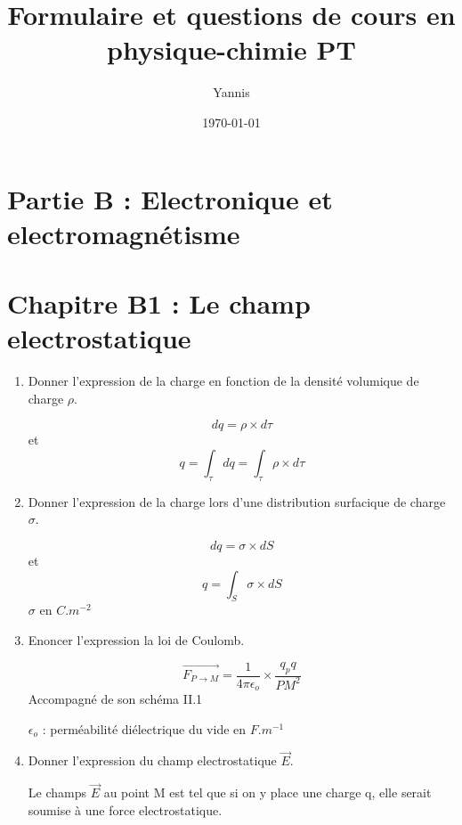 \documentclass{article}
\title{Formulaire et questions de cours en physique-chimie PT}
\author{Yannis}
\date{\today}
\begin{document}
\maketitle
\newpage

\section*{\centering\huge Partie B : Electronique et electromagnétisme}

\section*{\centering Chapitre B1 : Le champ electrostatique}
\begin{enumerate}[label=\arabic{enumi} - , left=0pt, itemsep=1em] %
    \item Donner l'expression de la charge en fonction de la densité volumique de charge $\rho$. \par
    \begin{solution}
          \[ dq = \rho \times d\tau \] et \[ q = \int_\tau dq = \int_\tau \rho \times d\tau \]
    \end{solution}

    \item Donner l'expression de la charge lors d'une distribution surfacique de charge $\sigma $. \par
    \begin{solution}
          \[ dq = \sigma \times dS \] et \[ q = \int_S \sigma \times dS \]
          $\sigma$ en $C.m^{-2}$
    \end{solution}

    \item Enoncer l'expression la loi de Coulomb. \par
    \begin{solution}
          \[ \overrightarrow{F_{P \to M}} = \frac{1}{4 \pi \epsilon_o} \times \frac{q_pq}{PM^2} \]
          Accompagné de son schéma II.1

           $\epsilon_o$ : perméabilité diélectrique du vide en $F.m^{-1}$
    \end{solution}

    \item Donner l'expression du champ electrostatique $\vec{E}$. \par
    \begin{solution}
          Le champs $\vec{E}$ au point M est tel que si on y place une charge q, elle serait soumise à une force electrostatique.
    \end{solution}


\end{enumerate}
\end{document}
